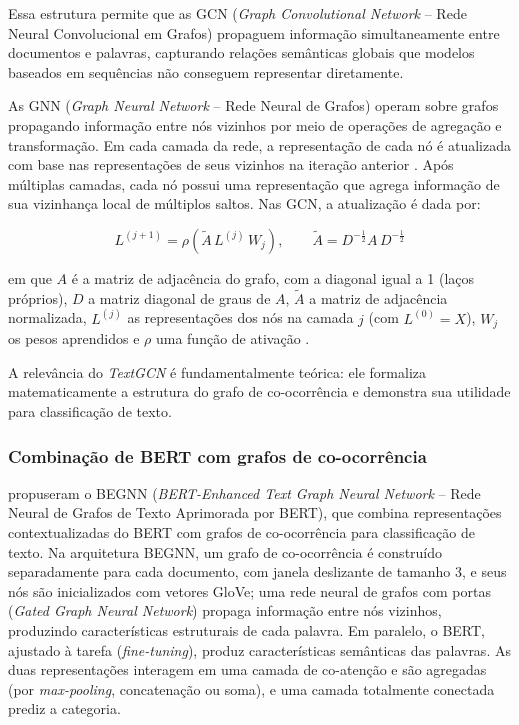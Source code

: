 \documentclass[
    12pt,                %
    openright,           %
    oneside,             %
    a4paper,             %
    english,             %
    brazil               %
]{abntex2}
\begin{document}
Essa estrutura permite que as GCN (\textit{Graph Convolutional Network} -- Rede Neural Convolucional em Grafos) propaguem informação simultaneamente entre documentos e palavras, capturando relações semânticas globais que modelos baseados em sequências não conseguem representar diretamente.

\label{subsubsec:textgcn_gcn}

As GNN (\textit{Graph Neural Network} -- Rede Neural de Grafos) operam sobre grafos propagando informação entre nós vizinhos por meio de operações de agregação e transformação. Em cada camada da rede, a representação de cada nó é atualizada com base nas representações de seus vizinhos na iteração anterior \cite{yao2019}. Após múltiplas camadas, cada nó possui uma representação que agrega informação de sua vizinhança local de múltiplos saltos. Nas GCN, a atualização é dada por:

\begin{equation}
L^{(j+1)} = \rho\!\left( \tilde{A}\, L^{(j)}\, W_j \right), \qquad
\tilde{A} = D^{-\frac{1}{2}} A\, D^{-\frac{1}{2}}
\label{eq:gcn}
\end{equation}

em que $A$ é a matriz de adjacência do grafo, com a diagonal igual a 1 (laços próprios), $D$ a matriz diagonal de graus de $A$, $\tilde A$ a matriz de adjacência normalizada, $L^{(j)}$ as representações dos nós na camada $j$ (com $L^{(0)} = X$), $W_j$ os pesos aprendidos e $\rho$ uma função de ativação \cite{yao2019}.

A relevância do \textit{TextGCN} é fundamentalmente teórica: ele formaliza matematicamente a estrutura do grafo de co-ocorrência e demonstra sua utilidade para classificação de texto.

\subsubsection{Combinação de BERT com grafos de co-ocorrência}
\label{subsec:bert_grafo}

\label{subsubsec:bert_grafo_embeddings}

 propuseram o BEGNN (\textit{BERT-Enhanced Text Graph Neural Network} -- Rede Neural de Grafos de Texto Aprimorada por BERT), que combina representações contextualizadas do BERT com grafos de co-ocorrência para classificação de texto. Na arquitetura BEGNN, um grafo de co-ocorrência é construído separadamente para cada documento, com janela deslizante de tamanho 3, e seus nós são inicializados com vetores GloVe; uma rede neural de grafos com portas (\textit{Gated Graph Neural Network}) propaga informação entre nós vizinhos, produzindo características estruturais de cada palavra. Em paralelo, o BERT, ajustado à tarefa (\textit{fine-tuning}), produz características semânticas das palavras. As duas representações interagem em uma camada de co-atenção e são agregadas (por \textit{max-pooling}, concatenação ou soma), e uma camada totalmente conectada prediz a categoria.
\end{document}
